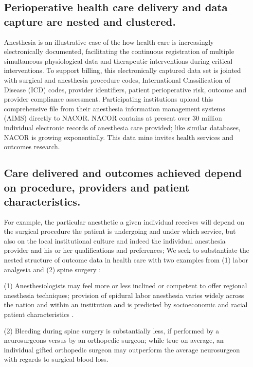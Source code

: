 \documentclass[11pt,notitlepage]{article}
\begin{document}
\subsection*{Perioperative health care delivery and data capture are nested and clustered.}
Anesthesia is an illustrative case of the how health care is increasingly electronically documented, facilitating the continuous registration of multiple simultaneous physiological   data and therapeutic interventions during critical interventions. To support billing, this electronically captured data set is jointed with surgical and anesthesia procedure codes, International Classification of Disease (ICD) codes, provider identifiers, patient perioperative risk, outcome and provider compliance assessment. Participating institutions upload this comprehensive file from their anesthesia information management systems (AIMS) directly to NACOR. NACOR contains at present over 30 million individual electronic records of anesthesia care provided; like similar databases, NACOR is growing exponentially. This data mine invites health services and outcomes research.

\subsection*{Care delivered and outcomes achieved depend on procedure, providers and patient characteristics.} For example, the particular anesthetic a given individual receives will depend on the surgical procedure the patient is undergoing and under which service, but also on the local institutional culture and indeed the individual anesthesia provider and his or her qualifications and preferences\cite{AndreaeWhite2015}; We seek to substantiate the nested structure of outcome data in health care with two examples from (1) labor analgesia and (2) spine surgery : 

(1) Anesthesiologists may feel more or less inclined or competent to offer regional anesthesia techniques; provision of epidural labor anesthesia varies widely across the nation and within an institution and is predicted by socioeconomic and racial patient characteristics \cite{Rust2004,Glance2007}.
 
(2) Bleeding during spine surgery is substantially less, if performed by a neurosurgeons versus by an orthopedic surgeon; while true on average, an individual gifted orthopedic surgeon may outperform the average neurosurgeon with regards to surgical blood loss.
\end{document}
